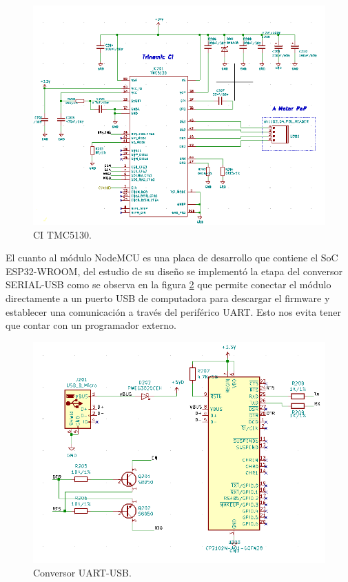 \begin{figure}[h]
	\centering
	\includegraphics[width=1\textwidth]{./Figures/kicad_trinamic.png}
	\caption{CI TMC5130.}
	\label{fig:kicad_trinamic}
\end{figure} 
 
El cuanto al módulo NodeMCU es una placa de desarrollo que contiene el SoC ESP32-WROOM, del estudio de su diseño se implementó la etapa del conversor SERIAL-USB como se observa en la figura \ref{fig:kicad_conversor} que permite conectar el módulo directamente a un puerto USB de computadora para descargar el firmware y establecer una comunicación a través del periférico UART. Esto nos evita tener que contar con un programador externo.
\begin{figure}[h]
	\centering
	\includegraphics[width=1\textwidth]{./Figures/kicad_conversor.png}
	\caption{Conversor UART-USB.}
	\label{fig:kicad_conversor}
\end{figure}

